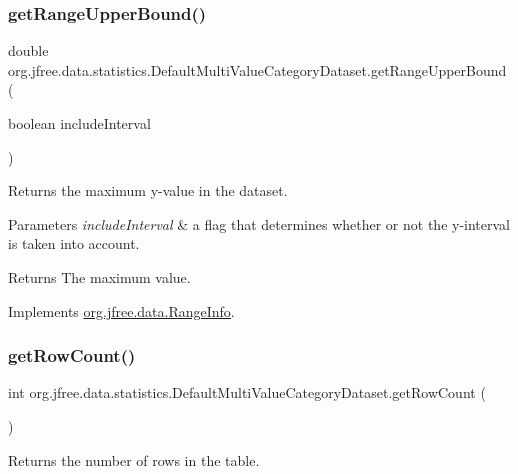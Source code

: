 \subsubsection{\texorpdfstring{get\+Range\+Upper\+Bound()}{getRangeUpperBound()}}
{\footnotesize\ttfamily double org.\+jfree.\+data.\+statistics.\+Default\+Multi\+Value\+Category\+Dataset.\+get\+Range\+Upper\+Bound (\begin{DoxyParamCaption}\item[{boolean}]{include\+Interval }\end{DoxyParamCaption})}

Returns the maximum y-\/value in the dataset.


\begin{DoxyParams}{Parameters}
{\em include\+Interval} & a flag that determines whether or not the y-\/interval is taken into account.\\
\hline
\end{DoxyParams}
\begin{DoxyReturn}{Returns}
The maximum value. 
\end{DoxyReturn}


Implements \mbox{\hyperlink{interfaceorg_1_1jfree_1_1data_1_1_range_info_a85987bb398c50351d190b2b888ff3348}{org.\+jfree.\+data.\+Range\+Info}}.

\mbox{\label{classorg_1_1jfree_1_1data_1_1statistics_1_1_default_multi_value_category_dataset_a50738261879dea73f8198740a043f342}} 
\subsubsection{\texorpdfstring{get\+Row\+Count()}{getRowCount()}}
{\footnotesize\ttfamily int org.\+jfree.\+data.\+statistics.\+Default\+Multi\+Value\+Category\+Dataset.\+get\+Row\+Count (\begin{DoxyParamCaption}{ }\end{DoxyParamCaption})}

Returns the number of rows in the table.

